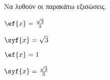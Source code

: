 Να λυθούν οι παρακάτω εξισώσεις.
\begin{multicols}{2}
\begin{alist}
\item $ \ef{x}=\frac{\sqrt{3}}{3} $
\item $ \syf{x}=\sqrt{3} $
\item $ \ef{x}=1 $
\item $ \syf{x}=\frac{\sqrt{3}}{3} $
\end{alist}
\end{multicols}
